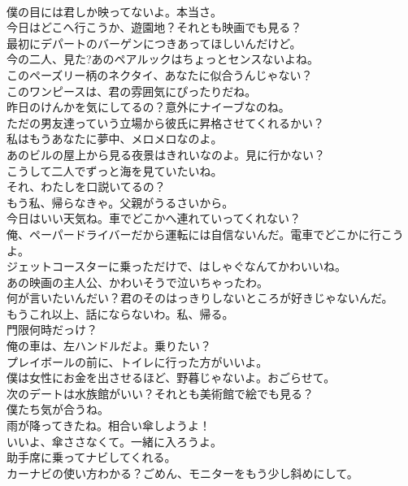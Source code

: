 \documentclass[8pt]{extreport}
\begin{document}
\begin{CJK}{UTF8}{min}
\\	僕の目には君しか映ってないよ。本当さ。	
\\	今日はどこへ行こうか、遊園地？それとも映画でも見る？	
\\	最初にデパートのバーゲンにつきあってほしいんだけど。	
\\	今の二人、見た?あのペアルックはちょっとセンスないよね。	
\\	このペーズリー柄のネクタイ、あなたに似合うんじゃない？	
\\	このワンピースは、君の雰囲気にぴったりだね。	
\\	昨日のけんかを気にしてるの？意外にナイーブなのね。	
\\	ただの男友達っていう立場から彼氏に昇格させてくれるかい？	
\\	私はもうあなたに夢中、メロメロなのよ。	
\\	あのビルの屋上から見る夜景はきれいなのよ。見に行かない？	
\\	こうして二人でずっと海を見ていたいね。	
\\	それ、わたしを口説いてるの？	
\\	もう私、帰らなきゃ。父親がうるさいから。	
\\	今日はいい天気ね。車でどこかへ連れていってくれない？	
\\	俺、ペーパードライバーだから運転には自信ないんだ。電車でどこかに行こうよ。	
\\	ジェットコースターに乗っただけで、はしゃぐなんてかわいいね。	
\\	あの映画の主人公、かわいそうで泣いちゃったわ。	
\\	何が言いたいんだい？君のそのはっきりしないところが好きじゃないんだ。	
\\	もうこれ以上、話にならないわ。私、帰る。	
\\	門限何時だっけ？	
\\	俺の車は、左ハンドルだよ。乗りたい？	
\\	プレイボールの前に、トイレに行った方がいいよ。	
\\	僕は女性にお金を出させるほど、野暮じゃないよ。おごらせて。	
\\	次のデートは水族館がいい？それとも美術館で絵でも見る？	
\\	僕たち気が合うね。	
\\	雨が降ってきたね。相合い傘しようよ！	
\\	いいよ、傘ささなくて。一緒に入ろうよ。	
\\	助手席に乗ってナビしてくれる。	
\\	カーナビの使い方わかる？ごめん、モニターをもう少し斜めにして。	

\end{CJK}
\end{document}

